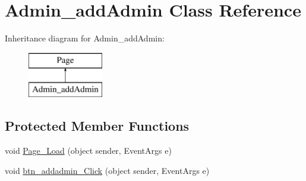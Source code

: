 \hypertarget{class_admin__add_admin}{}\section{Admin\+\_\+add\+Admin Class Reference}
\label{class_admin__add_admin}
Inheritance diagram for Admin\+\_\+add\+Admin\+:\begin{figure}[H]
\begin{center}
\leavevmode
\includegraphics[height=2.000000cm]{class_admin__add_admin}
\end{center}
\end{figure}
\subsection*{Protected Member Functions}
\begin{DoxyCompactItemize}
\item 
void \mbox{\hyperlink{class_admin__add_admin_a4f8ded2f9be33d8193191756fa355db7}{Page\+\_\+\+Load}} (object sender, Event\+Args e)
\item 
void \mbox{\hyperlink{class_admin__add_admin_ac5f8fab8381f37317b96455f13c5b776}{btn\+\_\+addadmin\+\_\+\+Click}} (object sender, Event\+Args e)
\end{DoxyCompactItemize}
